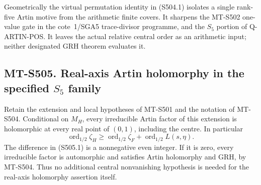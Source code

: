 Geometrically the virtual permutation identity in
(S504.1) isolates a single rank-five Artin motive from
the arithmetic finite covers. It sharpens the
MT-S502 one-value gate in the cote~1/SGA5 trace-divisor
programme, and the $S_5$ portion of Q-ARTIN-POS.
It leaves the actual relative central order as an
arithmetic input; neither designated GRH theorem
evaluates it.

\subsection*{MT-S505. Real-axis Artin holomorphy in the specified $S_5$ family}

Retain the extension and local hypotheses of MT-S501 and the
notation of MT-S504. Conditional on $M_H$, every irreducible
Artin factor of this extension is holomorphic at every real
point of $(0,1)$, including the centre. In particular
\[
 \operatorname{ord}_{1/2}\zeta_H
  \ge \operatorname{ord}_{1/2}\zeta_F
                  +\operatorname{ord}_{1/2}L(s,\eta).
 \tag{S505.1}
\]
The difference in (S505.1) is a nonnegative even integer.
If it is zero, every irreducible factor is automorphic
and satisfies Artin holomorphy and GRH, by MT-S504.
Thus no additional central nonvanishing hypothesis is
needed for the real-axis holomorphy assertion itself.

